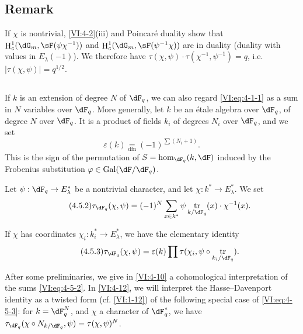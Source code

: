 \documentclass[oneside]{book}
\DeclareMathOperator{\gal}{Gal}
\DeclareMathOperator{\h}{H}
\DeclareMathOperator{\tr}{tr}
\newcounter{char}
\theoremstyle{sga-source}
\theoremstyle{sga-source-dash}
\theoremstyle{sga-source-dotdash}
\theoremstyle{sga-source-number-note-dash}
\theoremstyle{sga-source-note-number-dotdash}
\theoremstyle{sga-source-example-dotdash}
\theoremstyle{sga-source-inline-number}
\theoremstyle{sga-source-bare-number}
\theoremstyle{sga-source}
\newcommand{\PrintPage}[1]{}\newcommand{\MathPage}[1]{}\newcommand{\PrintCite}[2]{#1}\newcommand{\var}[3]{#2}
\begin{document}
\subsection{Remark}\label{VI:4-4}

If $\chi$ is nontrivial, \ref{VI:4-2}(iii) and Poincaré duality 
show that $\h_c^1(\dG_m,\sF(\psi\chi^{-1}))$ and 
$\h_c^1(\dG_m,\sF(\psi^{-1}\chi))$ are in duality (duality with values 
in $E_\lambda(-1)$). We therefore have 
$\tau(\chi,\psi)\cdot \tau(\chi^{-1},\psi^{-1}) = q$, i.e. 
$\var{|\tau(\chi,\psi)|=q}{|\tau(\chi,\psi)|=q^{1/2}}{S45-SOL-0805}$. 





\subsection{}\label{VI:4-5}

If $k$ is an extension of degree $N$ of $\dF_q$, we can also regard 
\eqref{VI:eq:4-1-1} as a sum in $N$ variables over $\dF_q$. More 
generally, let $k$ be an étale algebra over $\dF_q$, of degree $N$ over 
$\dF_q$. It is a product of fields $k_i$ of degrees $N_i$ over $\dF_q$, and we set 
\begin{equation*}\tag{4.5.1}\label{VI:eq:4-5-1}
  \varepsilon(k) \underset{\mathrm{dfn}}{=} (-1)^{\sum (N_i+1)} \text{.} 
\end{equation*}
This is the sign of the permutation of $S=\hom_{\dF_q}(k,\dF)$ induced by the 
Frobenius substitution $\varphi\in \gal(\dF/\dF_q)$. 

Let $\psi:\dF_q\to E_\lambda^\ast$ be a nontrivial character, and let 
$\chi:k^\ast \to E_\lambda^\ast$. We set 
\begin{equation*}\tag{4.5.2}\label{VI:eq:4-5-2}
  \tau_{\dF_q}(\chi,\psi) = (-1)^N \sum_{x\in k^\ast} \psi \tr_{k/\dF_q}(x) \cdot \chi^{-1}(x) \text{.} 
\end{equation*}

If $\chi$ has coordinates $\chi_i:k_i^\ast \to E_\lambda^\ast$, we 
have the elementary identity 
\begin{equation*}\tag{4.5.3}\label{VI:eq:4-5-3}
  \tau_{\dF_q}(\chi,\psi) = \varepsilon(k) \prod \tau(\chi_i,\psi\circ \tr_{k_i/\dF_q}) \text{.}
\end{equation*}

\PrintPage{198}
After some preliminaries, we give in \ref{VI:4-10} a 
cohomological interpretation of the sums \eqref{VI:eq:4-5-2}. In 
\ref{VI:4-12}, we will interpret the Hasse--Davenport identity as a 
twisted form (cf. \ref{VI:1-12}) of the following special case of 
\eqref{VI:eq:4-5-3}: for $k=\dF_q^N$, and $\chi$ a character of 
$\dF_q^\ast$, we have 
$\tau_{\dF_q}(\chi\circ N_{k/\dF_q},\psi)=\tau(\chi,\psi)^N$. 
\end{document}
